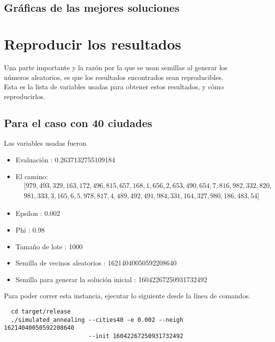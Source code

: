 \documentclass[a4paper]{article}
\begin{document}
\subsection*{Gr\'aficas de las mejores soluciones}



\section*{Reproducir los resultados}
Una parte importante y la raz\'on por la que se usan semillas al generar los n\'umeros aleatorios, es que los resultados encontrados sean reproducibles.\\

Esta es la lista de variables usadas para obtener estos resultados, y c\'omo reproducirlos.

\subsection*{Para el caso con 40 ciudades}
Las variables usadas fueron
\begin{itemize}
\item Evaluaci\'on : 0.2637132755109184
\item El camino:
  \begin{align*}
    &[979, 493, 329, 163, 172, 496, 815, 657, 168, 1, 656, 2, 653, 490, 654, 7, 816, 982, 332, 820,\\
    &981, 333, 3, 165, 6, 5, 978, 817, 4, 489, 492, 491, 984, 331, 164, 327, 980, 186, 483, 54]
  \end{align*}
  
\item Epsilon : 0.002
\item Phi : 0.98
\item Tamaño de lote : 1000
\item Semilla de vecinos aleatorios : 16214040050592208640
\item Semilla para generar la soluci\'on inicial : 16042267250931732492
\end{itemize}
Para poder correr esta instancia, ejecutar lo siguiente desde la l\'inea de comandos.
\begin{lstlisting}
  cd target/release
  ./simulated_annealing --cities40 -e 0.002 --neigh 16214040050592208640
                        --init 16042267250931732492
\end{lstlisting}
\end{document}
